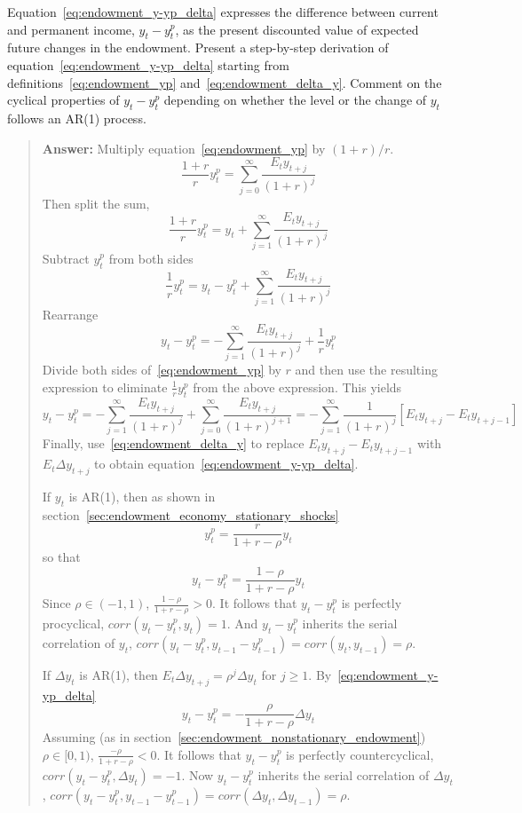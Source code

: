 \begin{exercise}\label{exercise:endowment_deriving_eq:endowment_y-yp_delta}
Equation~\eqref{eq:endowment_y-yp_delta}  expresses the difference between current  and permanent income, $y_t-y^p_t$,  as the present discounted value of expected future changes in the endowment. 
Present a step-by-step derivation of 
equation~\eqref{eq:endowment_y-yp_delta} starting from definitions~\eqref{eq:endowment_yp} and~\eqref{eq:endowment_delta_y}. 
Comment on the cyclical properties of $y_t-y^p_t$ depending on whether  the level or the change of $y_t$ follows an AR(1) process. 


\begin{quote}
{\bf Answer: } 
Multiply equation~\eqref{eq:endowment_yp} by $(1+r)/r$.
\[
\frac{1+r}{r}y^p_t  
=
\sum_{j=0}^{\infty} \frac{E_t y_{t+j}}{(1+r)^j}
\]
Then split the sum, 
\[
\frac{1+r}{r}y^p_t  
= y_t + 
\sum_{j=1}^{\infty} \frac{E_t y_{t+j}}{(1+r)^j}
\]
Subtract $y^p_t$ from both sides
\[
\frac{1}{r}y^p_t  
= y_t -y^p_t + 
\sum_{j=1}^{\infty} \frac{E_t y_{t+j}}{(1+r)^j}
\]
Rearrange
\[
y_t -y^p_t 
= 
- 
\sum_{j=1}^{\infty} \frac{E_t y_{t+j}}{(1+r)^j}
+\frac{1}{r}y^p_t  
\]
Divide both sides of~\eqref{eq:endowment_yp} by $r$ and then use the resulting expression to eliminate $\frac{1}{r}y^p_t  $ from the above expression. This yields
\[
y_t -y^p_t 
= 
- 
\sum_{j=1}^{\infty} \frac{E_t y_{t+j}}{(1+r)^j}
+\sum_{j=0}^{\infty} \frac{E_t y_{t+j}}{(1+r)^{j+1}}
=
- 
\sum_{j=1}^{\infty} 
\frac{1}{(1+r)^j} 
\left[
E_t y_{t+j} - E_t y_{t+j-1}
\right]
\]
Finally, use~\eqref{eq:endowment_delta_y} to replace 
$E_t y_{t+j} - E_t y_{t+j-1}$ with $E_t \Delta y_{t+j}$ to obtain equation~\eqref{eq:endowment_y-yp_delta}.

If $y_t$ is AR(1), then as shown in section~\ref{sec:endowment_economy_stationary_shocks}  
\[
y^p_t = \frac{r}{1+r-\rho} y_t
\]
so that 
\[
y_t - y^p_t = \frac{1-\rho}{1+r-\rho} y_t
\]
Since $\rho\in(-1,1)$, $\frac{1-\rho}{1+r-\rho}>0$. It follows that $y_t-y^p_t$ is perfectly procyclical, $corr(y_t-y^p_t, y_t) =1$. And $y_t-y^p_t$  inherits the serial correlation of $y_t$, $corr(y_t-y^p_t, y_{t-1}-y^p_{t-1}) = corr(y_t, y_{t-1}) = \rho$. 

If $\Delta y_t$ is AR(1), then $E_t \Delta y_{t+j} = \rho^j \Delta y_t$ for $j\ge 1$. By~\eqref{eq:endowment_y-yp_delta}
\[
y_t- y^p_t = -\frac{\rho}{1+r-\rho} \Delta y_t
\]
Assuming (as in section~\ref{sec:endowment_nonstationary_endowment})  $\rho\in[0,1)$, $\frac{-\rho}{1+r-\rho}<0$. It follows that $y_t-y^p_t$ is perfectly countercyclical, $corr(y_t-y^p_t, \Delta y_t) =-1$. Now $y_t-y^p_t$  inherits the serial correlation of $\Delta y_t$, $corr(y_t-y^p_t, y_{t-1}-y^p_{t-1}) = corr(\Delta y_t, \Delta y_{t-1}) = \rho$. 
\end{quote}
\end{exercise}



